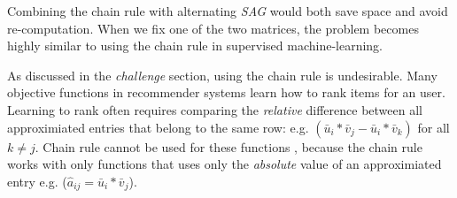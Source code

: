 Combining the chain rule with alternating \emph{SAG} would both save space and avoid re-computation.
When we fix one of the two matrices, the problem becomes highly similar to using the chain rule in supervised machine-learning.  

As discussed in the \emph{challenge} section, using the chain rule is undesirable.
Many objective functions in recommender systems learn how to rank items for an user.
Learning to rank often requires comparing the \emph{relative} difference between all approximiated entries that belong to the same row:
e.g. $\left(\bar{u}_{i}*\bar{v}_{j} - \bar{u}_{i}*\bar{v}_{k}\right)$ for all $k \neq j$.
Chain rule cannot be used for these functions \cite{gapfm, climf, bpr, mnar, mmmf}, because 
the chain rule works with only functions that uses only the \emph{absolute} value of an approximiated entry e.g. ($\hat{a}_{ij} = \bar{u}_{i}*\bar{v}_{j}$).
